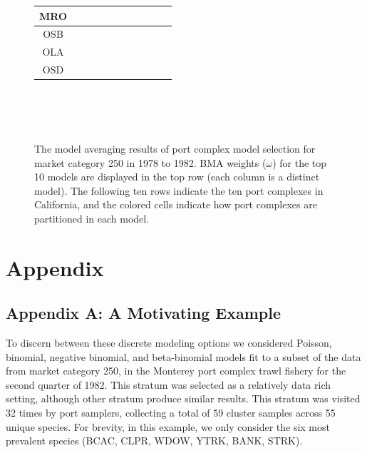 \documentclass[12pt]{article}
\begin{document}
\begin{landscape}
\begin{figure}[!h]
{\begin{tabular}{|c|c|c|c|c|c|c|c|c|c|c|}
        MRO&\cellcolor[HTML]{984EA3}&\cellcolor[HTML]{984EA3}&\cellcolor[HTML]{984EA3}&\cellcolor[HTML]{984EA3}&\cellcolor[HTML]{984EA3}&\cellcolor[HTML]{984EA3}&\cellcolor[HTML]{984EA3}&\cellcolor[HTML]{FF7F00}&\cellcolor[HTML]{984EA3}&\cellcolor[HTML]{984EA3} \\ \hline%
        OSB&\cellcolor[HTML]{FF7F00}&\cellcolor[HTML]{FF7F00}&\cellcolor[HTML]{FF7F00}&\cellcolor[HTML]{FF7F00}&\cellcolor[HTML]{FF7F00}&\cellcolor[HTML]{FF7F00}&\cellcolor[HTML]{FF7F00}&\cellcolor[HTML]{FF7F00}&\cellcolor[HTML]{984EA3}&\cellcolor[HTML]{FF7F00} \\ \hline%
        OLA&\cellcolor[HTML]{FF7F00}&\cellcolor[HTML]{FFFF33}&\cellcolor[HTML]{FF7F00}&\cellcolor[HTML]{FFFF33}&\cellcolor[HTML]{FF7F00}&\cellcolor[HTML]{FFFF33}&\cellcolor[HTML]{FFFF33}&\cellcolor[HTML]{FFFF33}&\cellcolor[HTML]{FF7F00}&\cellcolor[HTML]{FF7F00} \\ \hline%
        OSD&\cellcolor[HTML]{FF7F00}&\cellcolor[HTML]{FFFF33}&\cellcolor[HTML]{FFFF33}&\cellcolor[HTML]{A65628}&\cellcolor[HTML]{FFFF33}&\cellcolor[HTML]{FFFF33}&\cellcolor[HTML]{A65628}&\cellcolor[HTML]{FFFF33}&\cellcolor[HTML]{FFFF33}&\cellcolor[HTML]{FF7F00} \\ \hline%
\end{tabular}}
$~$\\$~$\\$~$\\
\caption{The model averaging results of port complex model selection for 
market category 250 in 1978 to 1982. BMA weights (\(\omega\)) for the top 10 
models are displayed in the top row (each column is a distinct model). The 
following ten rows indicate the ten port complexes in California, and the 
colored cells indicate how port complexes are partitioned in each model.}
\label{colorTab78}
\end{figure}
\end{landscape}

%
%
\section{Appendix}\label{appendix}
%
%

%
\subsection{Appendix A: A Motivating Example}\label{appLike}

To discern between these discrete modeling options we considered
Poisson, binomial, negative binomial, and beta-binomial models fit to a
subset of the data from market category 250, in the Monterey port complex trawl
fishery for the second quarter of 1982. This stratum was selected as a
relatively data rich setting, although other stratum produce similar
results. This stratum was visited 32 times by port samplers, collecting
a total of 59 cluster samples across 55 unique species. For brevity, in
this example, we only consider the six most prevalent species (BCAC,
CLPR, WDOW, YTRK, BANK, STRK).
\end{document}

